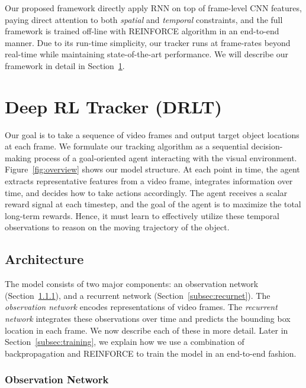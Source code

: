 \documentclass[10pt,twocolumn,letterpaper]{article}
\begin{document}
Our proposed framework directly apply RNN on top of frame-level CNN features, paying direct attention to both \emph{spatial} and \emph{temporal} constraints, and the full framework is trained off-line with REINFORCE algorithm in an end-to-end manner. Due to its run-time simplicity, our tracker runs at frame-rates beyond real-time while maintaining state-of-the-art performance. We will describe our framework in detail in Section~\ref{sec:DRLT}.

\section{Deep RL Tracker (DRLT)}
\label{sec:DRLT}

Our goal is to take a sequence of video frames and output target object locations at each frame. We formulate our tracking algorithm as a sequential decision-making process of a goal-oriented agent interacting with the visual environment. Figure~\ref{fig:overview} shows our model structure. At each point in time, the agent extracts representative features from a video frame, integrates information over time, and decides how to take actions accordingly. The agent receives a scalar reward signal at each timestep, and the goal of the agent is to maximize the total long-term rewards. Hence, it must learn to effectively utilize these temporal observations to reason on the moving trajectory of the object.

\subsection{Architecture}
\label{subsec:arch}

The model consists of two major components: an observation network (Section~\ref{subsec:obsernet}), and a recurrent network (Section~\ref{subsec:recurnet}). The \emph{observation network} encodes representations of video frames. The \emph{recurrent network} integrates these observations over time and predicts the bounding box location in each frame. We now describe each of these in more detail. Later in Section~\ref{subsec:training}, we explain how we use a combination of backpropagation and REINFORCE to train the model in an end-to-end fashion. 
 
\subsubsection{Observation Network}
\label{subsec:obsernet}
\end{document}
